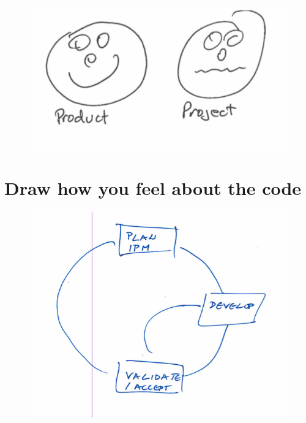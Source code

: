 \begin{figure}[H]
\centering
\includegraphics[width=6.5in]{interviews/drawings/2016_02_25.png}
\caption{}
\end{figure}

\section{Draw how you feel about the code}
\label{AppendixFeelAboutTheCode}

\begin{figure}[H]
\centering
\includegraphics[width=6.5in]{interviews/drawings/2015_12_18b.png}
\caption{}
\end{figure}


